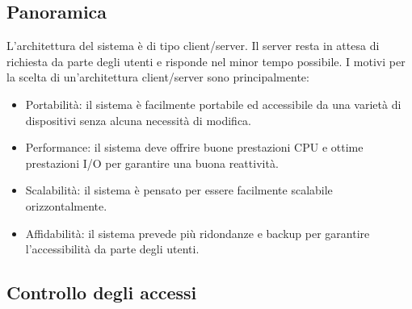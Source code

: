 \documentclass[12pt,a4paper]{article}
\begin{document}
\subsection{Panoramica}
L'architettura del sistema è di tipo client/server. Il server resta in attesa di richiesta da parte degli utenti e risponde nel minor tempo possibile.
I motivi per la scelta di un'architettura client/server sono principalmente:
\begin{itemize}
\item Portabilità: il sistema è facilmente portabile ed accessibile da una varietà di dispositivi senza alcuna necessità di modifica.
\item Performance: il sistema deve offrire buone prestazioni CPU e ottime prestazioni I/O per garantire una buona reattività.
\item Scalabilità: il sistema è pensato per essere facilmente scalabile orizzontalmente.
\item Affidabilità: il sistema prevede più ridondanze e backup per garantire l'accessibilità da parte degli utenti.
\end{itemize}

\subsection{Controllo degli accessi}
\end{document}
